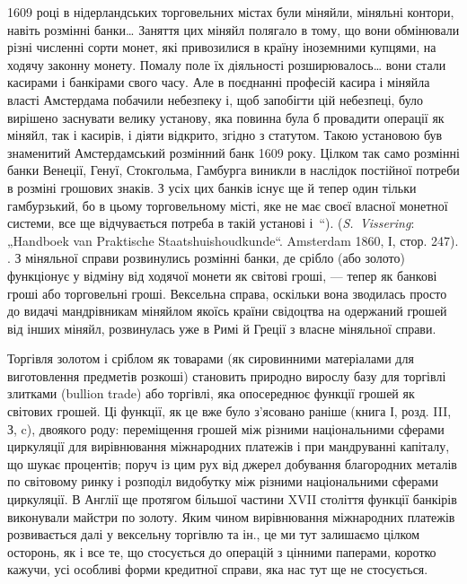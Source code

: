 {1609 році в нідерландських торговельних містах були міняйли, міняльні контори,
навіть розмінні банки\dots{} Заняття цих міняйл полягало в тому, що вони
обмінювали різні численні сорти монет, які привозилися в країну іноземними
купцями, на ходячу законну монету. Помалу поле їх діяльності розширювалось\dots{} вони стали касирами і банкірами свого часу. Але в поєднанні професій
касира і міняйла власті Амстердама побачили небезпеку і, щоб запобігти цій
небезпеці, було вирішено заснувати велику установу, яка повинна була б провадити
операції як міняйл, так і касирів, і діяти відкрито, згідно з статутом.
Такою установою був знаменитий Амстердамський розмінний банк 1609 року.
Цілком так само розмінні банки Венеції, Генуї, Стокгольма, Гамбурга виникли
в наслідок постійної потреби в розміні грошових знаків. З усіх цих банків
існує ще й тепер один тільки гамбурзький, бо в цьому торговельному місті, яке
не має своєї власної монетної системи, все ще відчувається потреба в такій
установі і~“). (\emph{S.~Vissering}: „Handboek van Praktische Staatshuishoudkunde“.
Amsterdam 1860, І, стор. 247).
}. З міняльної справи розвинулись розмінні банки, де
срібло (або золото) функціонує у відміну від ходячої монети
як світові гроші, — тепер як банкові гроші або торговельні гроші.
Вексельна справа, оскільки вона зводилась просто до видачі мандрівникам
міняйлом якоїсь країни свідоцтва на одержаний грошей
від інших міняйл, розвинулась уже в Римі й Греції з власне
міняльної справи.

Торгівля золотом і сріблом як товарами (як сировинними
матеріалами для виготовлення предметів розкоші) становить
природно вирослу базу для торгівлі злитками (bullion trade) або
торгівлі, яка опосереднює функції грошей як світових грошей.
Ці функції, як це вже було з’ясовано раніше (книга І, розд. III,
З, c), двоякого роду: переміщення грошей між різними національними
сферами циркуляції для вирівнювання міжнародних
платежів і при мандруванні капіталу, що шукає процентів;
поруч із цим рух від джерел добування благородних металів
по світовому ринку і розподіл видобутку між різними національними
сферами циркуляції. В Англії ще протягом більшої
частини XVII століття функції банкірів виконували майстри
по золоту. Яким чином вирівнювання міжнародних платежів
розвивається далі у вексельну торгівлю та ін., це ми тут залишаємо
цілком осторонь, як і все те, що стосується до операцій
з цінними паперами, коротко кажучи, усі особливі форми
кредитної справи, яка нас тут ще не стосується.

